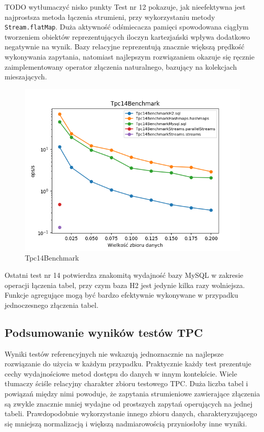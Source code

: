 \documentclass[12pt,twoside,openright]{extarticle}
\begin{document}
TODO wytłumaczyć nisko punkty
    Test nr 12 pokazuje, jak nieefektywna jest najprostsza metoda łączenia strumieni, przy wykorzystaniu metody \texttt{Stream.flatMap}. Duża aktywność odśmiecacza pamięci spowodowana ciągłym tworzeniem obiektów reprezentujących iloczyn kartezjański wpływa dodatkowo negatywnie na wynik. Bazy relacyjne reprezentują znacznie większą prędkość wykonywania zapytania, natomiast najlepszym rozwiązaniem okazuje się ręcznie zaimplementowany operator złączenia naturalnego, bazujący na kolekcjach mieszających.

\newpage
\begin{figure}[H]
\centering
\includegraphics[width=15cm]{plots/Tpc14Benchmark}
\caption{Tpc14Benchmark}
\end{figure}

    Ostatni test nr 14 potwierdza znakomitą wydajność bazy MySQL w zakresie operacji łączenia tabel, przy czym baza H2 jest jedynie kilka razy wolniejsza. Funkcje agregujące mogą być bardzo efektywnie wykonywane w przypadku jednoczesnego złączenia tabel.

\subsection{Podsumowanie wyników testów TPC}

    Wyniki testów referencyjnych nie wskazują jednoznacznie na najlepsze rozwiązanie do użycia w każdym przypadku. Praktycznie każdy test prezentuje cechy wydajnościowe metod dostępu do danych w innym kontekście. Wiele tłumaczy ściśle relacyjny charakter zbioru testowego TPC. Duża liczba tabel i powiązań między nimi powoduje, że zapytania strumieniowe zawierające złączenia są zwykle znacznie mniej wydajne od prostszych zapytań operujących na jednej tabeli. Prawdopodobnie wykorzystanie innego zbioru danych, charakteryzującego się mniejszą normalizacją i większą nadmiarowością przyniosłoby inne wyniki. 
\end{document}
